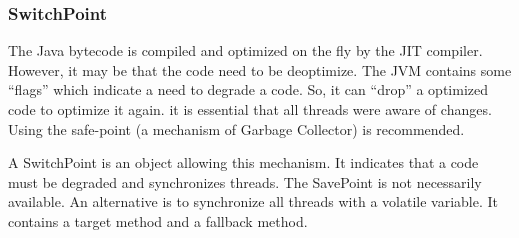 \documentclass{sigplanconf}
\def \JVM{JVM\xspace}
\begin{document}
      \subsubsection{SwitchPoint}
        The Java bytecode is compiled and optimized on the fly by the JIT compiler.
        However, it may be that the code need to be deoptimize.
        The \JVM contains some ``flags'' which indicate a need to degrade a code.
        So, it can ``drop'' a optimized code to optimize it again.
        it is essential that all threads were aware of changes.
        Using the safe-point (a mechanism of Garbage Collector) is recommended.

        A SwitchPoint is an object allowing this mechanism.
        It indicates that a code must be degraded and synchronizes threads.
        The SavePoint is not necessarily available.
        An alternative is to synchronize all threads with a volatile variable.
        It contains a target method and a fallback method.
        
\end{document}
